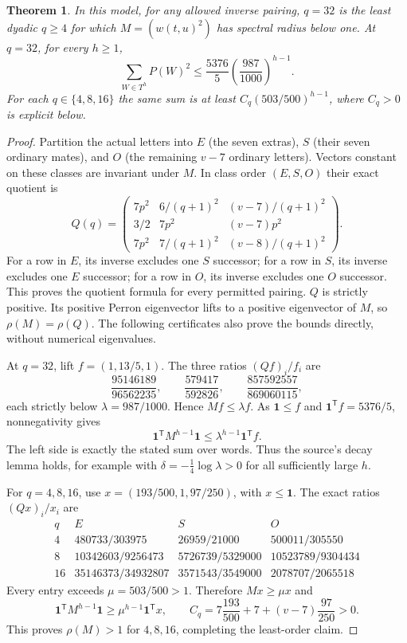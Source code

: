 \documentclass[11pt]{article}
\newtheorem{theorem}{Theorem}
\begin{document}
\begin{theorem}\label{thm:threshold}
In this model, for any allowed inverse pairing, $q=32$ is the least
dyadic $q\ge4$ for which $M=(w(t,u)^2)$ has spectral radius below one.
At $q=32$, for every $h\ge1$,
\[
\sum_{W\in T^h}P(W)^2\le\frac{5376}{5}
       \left(\frac{987}{1000}\right)^{h-1}.
\]
For each $q\in\{4,8,16\}$ the same sum is at least
$C_q(503/500)^{h-1}$, where $C_q>0$ is explicit below.
\end{theorem}
\begin{proof}
Partition the actual letters into $E$ (the seven extras), $S$ (their
seven ordinary mates), and $O$ (the remaining $v-7$ ordinary letters).
Vectors constant on these classes are invariant under $M$. In class
order $(E,S,O)$ their exact quotient is
\begin{equation}\label{eq:quotient}
Q(q)=\begin{pmatrix}
7p^2&6/(q+1)^2&(v-7)/(q+1)^2\\
3/2&7p^2&(v-7)p^2\\
7p^2&7/(q+1)^2&(v-8)/(q+1)^2
\end{pmatrix}.
\end{equation}
For a row in $E$, its inverse excludes one $S$ successor; for a row in
$S$, its inverse excludes one $E$ successor; for a row in $O$, its
inverse excludes one $O$ successor. This proves the quotient formula
for every permitted pairing. $Q$ is strictly positive. Its positive
Perron eigenvector lifts to a positive eigenvector of $M$, so
$\rho(M)=\rho(Q)$. The following certificates also prove the bounds
directly, without numerical eigenvalues.

At $q=32$, lift $f=(1,13/5,1)$. The three ratios $(Qf)_i/f_i$ are
\begin{equation}\label{eq:upper}
\frac{95146189}{96562235},\qquad
\frac{579417}{592826},\qquad
\frac{857592557}{869060115},
\end{equation}
each strictly below $\lambda=987/1000$. Hence
$Mf\le\lambda f$. As $\mathbf1\le f$ and
$\mathbf1^{\mathsf T}f=5376/5$, nonnegativity gives
\[
\mathbf1^{\mathsf T}M^{h-1}\mathbf1
 \le\lambda^{h-1}\mathbf1^{\mathsf T}f.
\]
The left side is exactly the stated sum over words.
Thus the source's decay lemma holds, for example with
$\delta=-\frac14\log\lambda>0$ for all sufficiently large $h$.

For $q=4,8,16$, use $x=(193/500,1,97/250)$, with $x\le\mathbf1$.
The exact ratios $(Qx)_i/x_i$ are
\[
\begin{array}{c|ccc}
q&E&S&O\\\hline
4&480733/303975&26959/21000&500011/305550\\
8&10342603/9256473&5726739/5329000&10523789/9304434\\
16&35146373/34932807&3571543/3549000&2078707/2065518
\end{array}
\]
Every entry exceeds $\mu=503/500>1$. Therefore $Mx\ge\mu x$ and
\[
\mathbf1^{\mathsf T}M^{h-1}\mathbf1
 \ge\mu^{h-1}\mathbf1^{\mathsf T}x,
\qquad C_q=7\frac{193}{500}+7+(v-7)\frac{97}{250}>0.
\]
This proves $\rho(M)>1$ for $4,8,16$, completing the least-order claim.
\end{proof}
\end{document}
